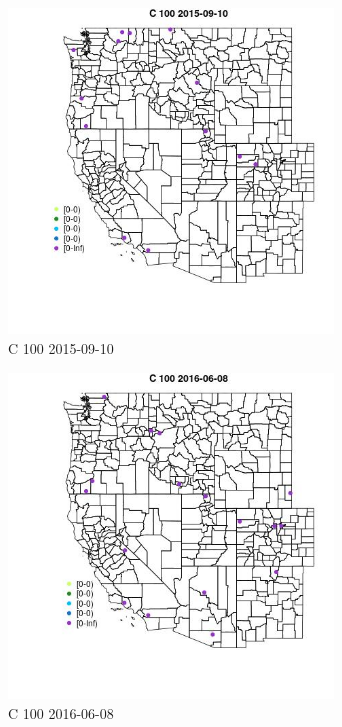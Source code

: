 \begin{figure} 
\centering  
\includegraphics[width=0.77\textwidth]{Code_Outputs/Report_ML_input_PM25_Step4_part_e_de_duplicated_aves_MapObsC_1002015-09-10.jpg} 
\caption{\label{fig:Report_ML_input_PM25_Step4_part_e_de_duplicated_avesMapObsC_1002015-09-10}C 100 2015-09-10} 
\end{figure} 
 

\begin{figure} 
\centering  
\includegraphics[width=0.77\textwidth]{Code_Outputs/Report_ML_input_PM25_Step4_part_e_de_duplicated_aves_MapObsC_1002016-06-08.jpg} 
\caption{\label{fig:Report_ML_input_PM25_Step4_part_e_de_duplicated_avesMapObsC_1002016-06-08}C 100 2016-06-08} 
\end{figure} 
 

